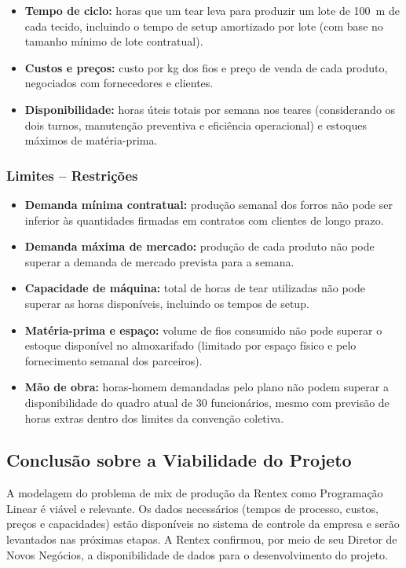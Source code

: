 \begin{itemize}
  \item \textbf{Tempo de ciclo:} horas que um tear leva para produzir um lote de
        100~m de cada tecido, incluindo o tempo de setup amortizado por lote
        (com base no tamanho mínimo de lote contratual).
  \item \textbf{Custos e preços:} custo por kg dos fios e preço de venda de cada
        produto, negociados com fornecedores e clientes.
  \item \textbf{Disponibilidade:} horas úteis totais por semana nos teares
        (considerando os dois turnos, manutenção preventiva e eficiência operacional)
        e estoques máximos de matéria-prima.
\end{itemize}

\subsubsection{Limites -- Restrições}

\begin{itemize}
  \item \textbf{Demanda mínima contratual:} produção semanal dos forros não pode
        ser inferior às quantidades firmadas em contratos com clientes de longo
        prazo.
  \item \textbf{Demanda máxima de mercado:} produção de cada produto não pode
        superar a demanda de mercado prevista para a semana.
  \item \textbf{Capacidade de máquina:} total de horas de tear utilizadas não pode
        superar as horas disponíveis, incluindo os tempos de setup.
  \item \textbf{Matéria-prima e espaço:} volume de fios consumido não pode superar
        o estoque disponível no almoxarifado (limitado por espaço físico e pelo
        fornecimento semanal dos parceiros).
  \item \textbf{Mão de obra:} horas-homem demandadas pelo plano não podem
        superar a disponibilidade do quadro atual de 30 funcionários, mesmo com
        previsão de horas extras dentro dos limites da convenção coletiva.
\end{itemize}

\subsection{Conclusão sobre a Viabilidade do Projeto}

A modelagem do problema de mix de produção da Rentex como Programação Linear
é viável e relevante. Os dados necessários (tempos de processo, custos, preços
e capacidades) estão disponíveis no sistema de controle da empresa e serão
levantados nas próximas etapas. A Rentex confirmou, por meio de seu Diretor de
Novos Negócios, a disponibilidade de dados para o desenvolvimento do projeto.

